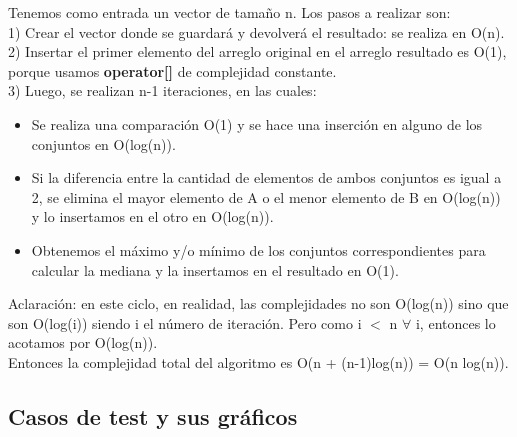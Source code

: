 Tenemos como entrada un vector de tamaño n. Los pasos a realizar son: \\

1) Crear el vector donde se guardará y devolverá el resultado: se realiza en O(n). \\

2) Insertar el primer elemento del arreglo original en el arreglo resultado es O(1), porque usamos \textbf{operator[]} de complejidad constante. \\

3) Luego, se realizan n-1 iteraciones, en las cuales: \\
\begin{itemize}
\item Se realiza una comparación O(1) y se hace una inserción en alguno de los conjuntos en O(log(n)).
\item Si la diferencia entre la cantidad de elementos de ambos conjuntos es igual a 2, se elimina el mayor elemento de A o el menor elemento de B en O(log(n)) y lo insertamos en el otro en O(log(n)).
\item Obtenemos el máximo y/o mínimo de los conjuntos correspondientes para calcular la mediana y la insertamos en el resultado en O(1).
\end{itemize}
Aclaración: en este ciclo, en realidad, las complejidades no son O(log(n)) sino que son O(log(i)) siendo i el número de iteración. Pero como i $<$ n $\forall$ i, entonces lo acotamos por O(log(n)). \\

Entonces la complejidad total del algoritmo es O(n + (n-1)log(n)) = O(n log(n)).

\subsection{Casos de test y sus gráficos}

